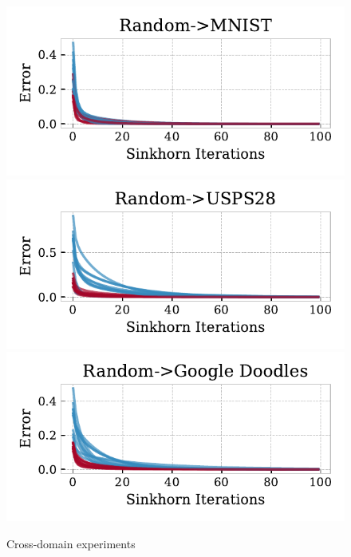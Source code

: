 \documentclass{article}
\begin{document}
\begin{figure}[!t]
    \includegraphics[width=.32\linewidth]{fig/cross_domain/errs_random_mnist.pdf}
    \includegraphics[width=.32\linewidth]{fig/cross_domain/errs_random_usps28.pdf}
    \includegraphics[width=.32\linewidth]{fig/cross_domain/errs_random_doodles.pdf}
    
    \label{fig:cross_domain}
    \caption{Cross-domain experiments}
\end{figure}
\end{document}
